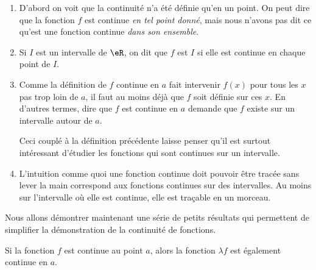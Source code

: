 \begin{enumerate}
\item D'abord on voit que la continuité n'a été définie qu'en un point. On peut dire que la fonction $f$ est continue \emph{en tel point donné}, mais nous n'avons pas dit ce qu'est une fonction continue \emph{dans son ensemble}.

\item Si $I$ est un intervalle de $\eR$, on dit que $f$ est  $I$ si elle est continue en chaque point de $I$.

\item Comme la définition de $f$ continue en $a$ fait intervenir $f(x)$ pour tous les $x$ pas trop loin de $a$, il faut au moins déjà que $f$ soit définie sur ces $x$. En d'autres termes, dire que $f$ est continue en $a$ demande que $f$ existe sur un intervalle autour de $a$. 

Ceci couplé à la définition précédente laisse penser qu'il est surtout intéressant d'étudier les fonctions qui sont continues sur un intervalle.

\item L'intuition comme quoi une fonction continue doit pouvoir être tracée sans lever la main correspond aux fonctions continues sur des intervalles. Au moins sur l'intervalle où elle est continue, elle est traçable en un morceau.
\end{enumerate}


Nous allons démontrer maintenant une série de petits résultats qui permettent de simplifier la démonstration de la continuité de fonctions.
\begin{theorem}
Si la fonction $f$ est continue au point $a$, alors la fonction $\lambda f$ est également continue en $a$.
\end{theorem}

